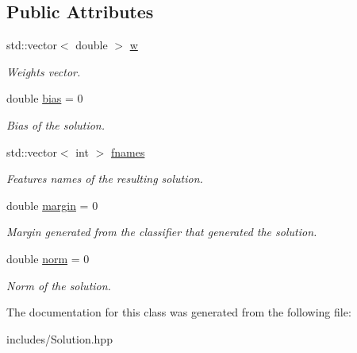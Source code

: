 \subsection*{Public Attributes}
\begin{DoxyCompactItemize}
\item 
\mbox{\label{class_solution_a736054c66aab1014bba4a71de293ad2f}} 
std\+::vector$<$ double $>$ \hyperlink{class_solution_a736054c66aab1014bba4a71de293ad2f}{w}
\begin{DoxyCompactList}\small\item\em Weights vector. \end{DoxyCompactList}\item 
\mbox{\label{class_solution_ac0a589a77d238aecf14c91f55d1b8daa}} 
double \hyperlink{class_solution_ac0a589a77d238aecf14c91f55d1b8daa}{bias} = 0
\begin{DoxyCompactList}\small\item\em Bias of the solution. \end{DoxyCompactList}\item 
\mbox{\label{class_solution_a86d40d16bfa9e7dbe476a62008431987}} 
std\+::vector$<$ int $>$ \hyperlink{class_solution_a86d40d16bfa9e7dbe476a62008431987}{fnames}
\begin{DoxyCompactList}\small\item\em Features names of the resulting solution. \end{DoxyCompactList}\item 
\mbox{\label{class_solution_a3580af26a22d86e44df701f654165e0f}} 
double \hyperlink{class_solution_a3580af26a22d86e44df701f654165e0f}{margin} = 0
\begin{DoxyCompactList}\small\item\em Margin generated from the classifier that generated the solution. \end{DoxyCompactList}\item 
\mbox{\label{class_solution_acbc0610c1c2e2d7bb5c39af33b7eb99c}} 
double \hyperlink{class_solution_acbc0610c1c2e2d7bb5c39af33b7eb99c}{norm} = 0
\begin{DoxyCompactList}\small\item\em Norm of the solution. \end{DoxyCompactList}\end{DoxyCompactItemize}


The documentation for this class was generated from the following file\+:\begin{DoxyCompactItemize}
\item 
includes/Solution.\+hpp\end{DoxyCompactItemize}

